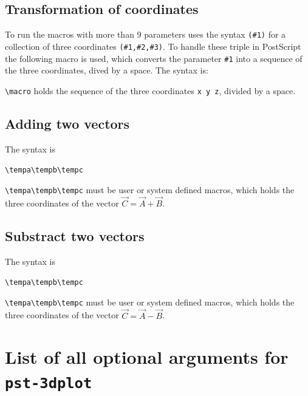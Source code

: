 \documentclass[11pt,english,bibliography=totoc,parskip=false,headings=small,
    headinclude=false,footinclude=false,twoside,english,usegeometry]{pst-doc}
\begin{document}
\subsection{Transformation of coordinates}
To run the macros with more than 9 parameters  uses
the syntax \verb|(#1)| for a collection of three coordinates \verb|(#1,#2,#3)|.
To handle these triple in PostScript the following macro is used, which converts
the parameter \verb|#1| into a sequence of the three coordinates, dived by a space.
The syntax is:
%
\begin{BDef}
\end{BDef}

\verb|\macro| holds the sequence of the three coordinates \verb|x y z|, divided by a space.

\subsection{Adding two vectors}
The syntax is
\begin{BDef}
\verb+\tempa\tempb\tempc+
\end{BDef}

\verb|\tempa\tempb\tempc| must be user or system defined macros, which holds the three
coordinates of the vector $\vec{C}=\vec{A}+\vec{B}$.

\subsection{Substract two vectors}
The syntax is
\begin{BDef}
\verb+\tempa\tempb\tempc+
\end{BDef}

\verb|\tempa\tempb\tempc| must be user or system defined macros, which holds the three
coordinates of the vector $\vec{C}=\vec{A}-\vec{B}$.

\clearpage
\section{List of all optional arguments for \texttt{pst-3dplot}}



\bgroup
\nocite{*}
\RaggedRight
\printbibliography
\egroup

\printindex
\end{document}
